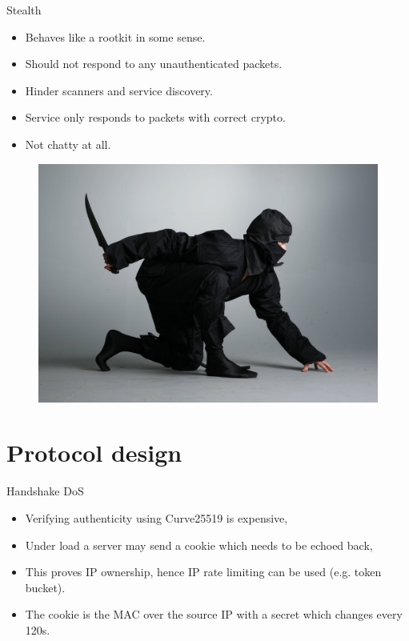 \documentclass[xcolor=table]{beamer}
\begin{document}
    \begin{frame}{Stealth}
        \begin{minipage}{0.6\textwidth}
            \begin{itemize}
                \item Behaves like a rootkit in some sense.
                \item Should not respond to any unauthenticated packets.
                \item Hinder scanners and service discovery.
                \item Service only responds to packets with correct crypto.
                \item Not chatty at all. 
            \end{itemize} 
        \end{minipage}
        \begin{minipage}{0.37\textwidth}
            \begin{figure}
                \includegraphics[width=\textwidth]{ninja.jpg}
            \end{figure}
        \end{minipage}
    \end{frame}

    \section{Protocol design}

    \begin{frame}{Handshake DoS}
    \begin{itemize}
        \item Verifying authenticity using Curve25519 is expensive,
        \item Under load a server may send a cookie which needs to be echoed back,
        \item This proves IP ownership, hence IP rate limiting can be used (e.g. token bucket).
        \item The cookie is the MAC over the source IP with a secret which changes every 120s.
    \end{itemize}
    \end{frame}
\end{document}
